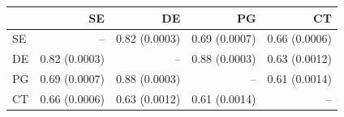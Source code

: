 \begin{tabular}{lrrrr}
\toprule
 & SE & DE & PG & CT \\
\midrule
SE & -- & 0.82 (0.0003) & 0.69 (0.0007) & 0.66 (0.0006) \\
DE & 0.82 (0.0003) & -- & 0.88 (0.0003) & 0.63 (0.0012) \\
PG & 0.69 (0.0007) & 0.88 (0.0003) & -- & 0.61 (0.0014) \\
CT & 0.66 (0.0006) & 0.63 (0.0012) & 0.61 (0.0014) & -- \\
\bottomrule
\end{tabular}

